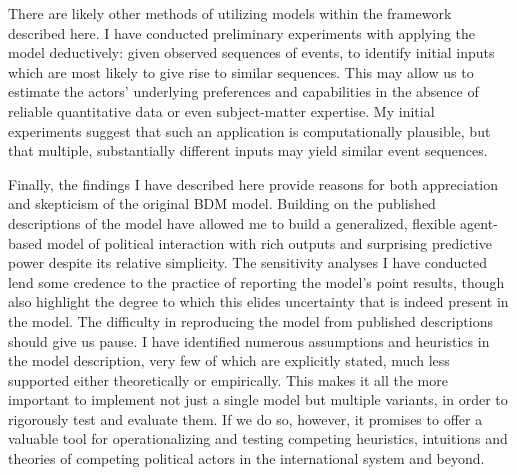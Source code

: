 There are likely other methods of utilizing models within the framework described here. I have conducted preliminary experiments with applying the model deductively: given observed sequences of events, to identify initial inputs which are most likely to give rise to similar sequences. This may allow us to estimate the actors' underlying preferences and capabilities in the absence of reliable quantitative data or even subject-matter expertise. My initial experiments suggest that such an application is computationally plausible, but that multiple, substantially different inputs may yield similar event sequences.

Finally, the findings I have described here provide reasons for both appreciation and skepticism of the original BDM model. Building on the published descriptions of the model have allowed me to build a generalized, flexible agent-based model of political interaction with rich outputs and surprising predictive power despite its relative simplicity. The sensitivity analyses I have conducted lend some credence to the practice of reporting the model's point results, though also highlight the degree to which this elides uncertainty that is indeed present in the model. The difficulty in reproducing the model from published descriptions should give us pause. I have identified numerous assumptions and heuristics in the model description, very few of which are explicitly stated, much less supported either theoretically or empirically. This makes it all the more important to implement not just a single model but multiple variants, in order to rigorously test and evaluate them. If we do so, however, it promises to offer a valuable tool for operationalizing and testing competing heuristics, intuitions and theories of competing political actors in the international system and beyond.
